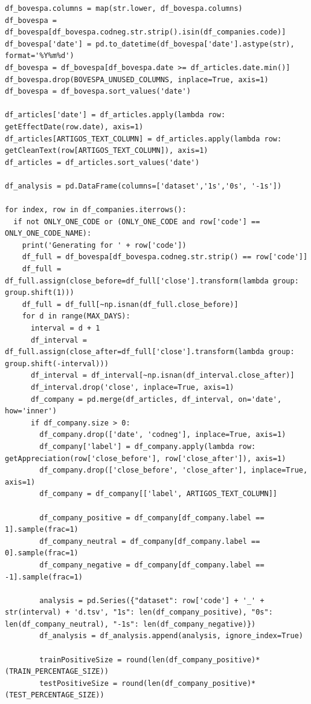\documentclass[grad,numbers]{coppe}
\begin{document}
\begin{verbatim}
df_bovespa.columns = map(str.lower, df_bovespa.columns)
df_bovespa = df_bovespa[df_bovespa.codneg.str.strip().isin(df_companies.code)]
df_bovespa['date'] = pd.to_datetime(df_bovespa['date'].astype(str), format='%Y%m%d')
df_bovespa = df_bovespa[df_bovespa.date >= df_articles.date.min()]
df_bovespa.drop(BOVESPA_UNUSED_COLUMNS, inplace=True, axis=1)
df_bovespa = df_bovespa.sort_values('date')

df_articles['date'] = df_articles.apply(lambda row: getEffectDate(row.date), axis=1)
df_articles[ARTIGOS_TEXT_COLUMN] = df_articles.apply(lambda row: getCleanText(row[ARTIGOS_TEXT_COLUMN]), axis=1)
df_articles = df_articles.sort_values('date')

df_analysis = pd.DataFrame(columns=['dataset','1s','0s', '-1s'])

for index, row in df_companies.iterrows():
  if not ONLY_ONE_CODE or (ONLY_ONE_CODE and row['code'] == ONLY_ONE_CODE_NAME):
    print('Generating for ' + row['code'])
    df_full = df_bovespa[df_bovespa.codneg.str.strip() == row['code']]
    df_full = df_full.assign(close_before=df_full['close'].transform(lambda group: group.shift(1)))
    df_full = df_full[~np.isnan(df_full.close_before)]
    for d in range(MAX_DAYS):
      interval = d + 1
      df_interval = df_full.assign(close_after=df_full['close'].transform(lambda group: group.shift(-interval)))
      df_interval = df_interval[~np.isnan(df_interval.close_after)]
      df_interval.drop('close', inplace=True, axis=1)
      df_company = pd.merge(df_articles, df_interval, on='date', how='inner')
      if df_company.size > 0:
        df_company.drop(['date', 'codneg'], inplace=True, axis=1)
        df_company['label'] = df_company.apply(lambda row: getAppreciation(row['close_before'], row['close_after']), axis=1)
        df_company.drop(['close_before', 'close_after'], inplace=True, axis=1)
        df_company = df_company[['label', ARTIGOS_TEXT_COLUMN]]
        
        df_company_positive = df_company[df_company.label == 1].sample(frac=1)
        df_company_neutral = df_company[df_company.label == 0].sample(frac=1)
        df_company_negative = df_company[df_company.label == -1].sample(frac=1)

        analysis = pd.Series({"dataset": row['code'] + '_' + str(interval) + 'd.tsv', "1s": len(df_company_positive), "0s": len(df_company_neutral), "-1s": len(df_company_negative)})
        df_analysis = df_analysis.append(analysis, ignore_index=True)
        
        trainPositiveSize = round(len(df_company_positive)*(TRAIN_PERCENTAGE_SIZE))
        testPositiveSize = round(len(df_company_positive)*(TEST_PERCENTAGE_SIZE))


\end{verbatim}
\end{document}
